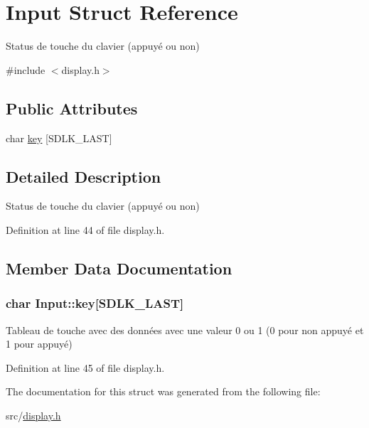 \hypertarget{struct_input}{\section{Input Struct Reference}
\label{struct_input}
}


Status de touche du clavier (appuyé ou non)  




{\ttfamily \#include $<$display.\-h$>$}

\subsection*{Public Attributes}
\begin{DoxyCompactItemize}
\item 
char \hyperlink{struct_input_a211bceabbcc2ccdd710502d596692ab5}{key} \mbox{[}S\-D\-L\-K\-\_\-\-L\-A\-S\-T\mbox{]}
\end{DoxyCompactItemize}


\subsection{Detailed Description}
Status de touche du clavier (appuyé ou non) 

Definition at line 44 of file display.\-h.



\subsection{Member Data Documentation}
\hypertarget{struct_input_a211bceabbcc2ccdd710502d596692ab5}{
\subsubsection[{key}]{\setlength{\rightskip}{0pt plus 5cm}char Input\-::key\mbox{[}S\-D\-L\-K\-\_\-\-L\-A\-S\-T\mbox{]}}}\label{struct_input_a211bceabbcc2ccdd710502d596692ab5}
Tableau de touche avec des données avec une valeur 0 ou 1 (0 pour non appuyé et 1 pour appuyé) 

Definition at line 45 of file display.\-h.



The documentation for this struct was generated from the following file\-:\begin{DoxyCompactItemize}
\item 
src/\hyperlink{display_8h}{display.\-h}\end{DoxyCompactItemize}
